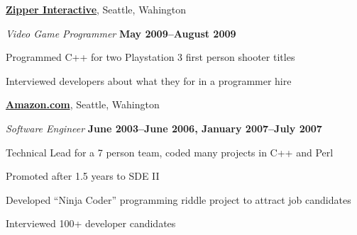 \documentclass[10pt]{article}
\newenvironment{outerlist}[1][\enskip\textbullet]%
        {\begin{itemize}[#1]}{\end{itemize}%
         \vspace{-.6\baselineskip}}
\newenvironment{innerlist}[1][\enskip\textbullet]%
        {\begin{compactitem}[#1]}{\end{compactitem}}
\newcommand{\blankline}{\quad\pagebreak[2]}
\begin{document}
\href{http://www.zipperint.com/}{\textbf{Zipper Interactive}},
Seattle, Wahington
\begin{outerlist}
\item[] \textit{Video Game Programmer}%
    \hfill \textbf{May 2009--August 2009}
    \begin{innerlist}
    \item Programmed C++ for two Playstation 3 first person shooter titles
    \item Interviewed developers about what they for in a programmer hire
    \end{innerlist}
\end{outerlist}
\blankline


\href{http://amazon.com}{\textbf{Amazon.com}},
Seattle, Wahington
\begin{outerlist}
\item[] \textit{Software Engineer}%
    \hfill \textbf{June 2003--June 2006, January 2007--July 2007}
    \begin{innerlist}
    \item Technical Lead for a 7 person team, coded many projects in C++ and Perl
    \item Promoted after 1.5 years to SDE II
    \item Developed ``Ninja Coder'' programming riddle project to attract job candidates
    \item Interviewed 100+ developer candidates
    \end{innerlist}
\end{outerlist}
\blankline


\end{document}
